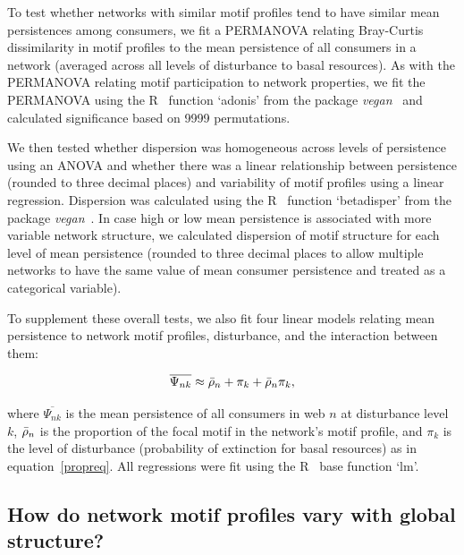 \documentclass[12pt]{article}
\begin{document}
\begin{spacing}{2.0}
        To test whether networks with similar motif profiles tend to have similar mean persistences among consumers, we fit a PERMANOVA relating Bray-Curtis dissimilarity in motif profiles to the mean persistence of all consumers in a network (averaged across all levels of disturbance to basal resources).
        As with the PERMANOVA relating motif participation to network properties, we fit the PERMANOVA using the R~\citep{R} function `adonis' from the package \emph{vegan}~\citep{vegan} and calculated significance based on 9999 permutations.


        We then tested whether dispersion was homogeneous across levels of persistence using an ANOVA and whether there was a linear relationship between persistence (rounded to three decimal places) and variability of motif profiles using a linear regression.
        Dispersion was calculated using the R~\citep{R} function `betadisper' from the package \emph{vegan}~\citep{vegan}.
        In case high or low mean persistence is associated with more variable network structure, we calculated dispersion of motif structure for each level of mean persistence (rounded to three decimal places to allow multiple networks to have the same value of mean consumer persistence and treated as a categorical variable). 

        
        To supplement these overall tests, we also fit four linear models relating mean persistence to network motif profiles, disturbance, and the interaction between them:

            \begin{equation}
                \overline{\Psi_{nk}} \approx \Bar{\rho}_{n} + \pi_{k} + \Bar{\rho}_{n}\pi_{k} ,
                \label{netpropeq}
            \end{equation}
        
        \noindent where $\overline{\Psi_{nk}}$ is the mean persistence of all consumers in web $n$ at disturbance level $k$, $\Bar{\rho}_{n}$ is the proportion of the focal motif in the network's motif profile, and $\pi_k$ is the level of disturbance (probability of extinction for basal resources) as in equation~\ref{propreq}. 
        All regressions were fit using the R~\citep{R} base function `lm'.
    

    \subsection{How do network motif profiles vary with global structure?}
    

\end{spacing}
\end{document}

